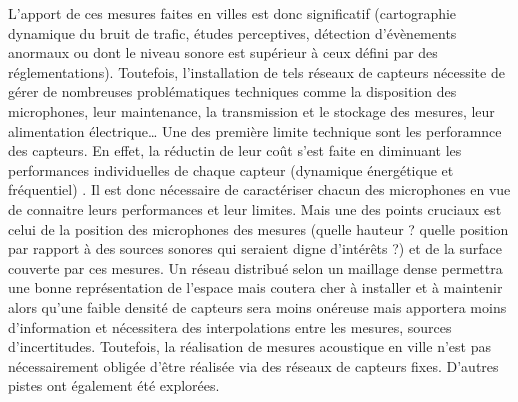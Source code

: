 L'apport de ces mesures faites en villes est donc significatif (cartographie dynamique du bruit de trafic, études perceptives, détection d'évènements anormaux ou dont le niveau sonore est supérieur à ceux défini par des réglementations). Toutefois, l'installation de tels réseaux de capteurs nécessite de gérer de nombreuses problématiques techniques comme la disposition des microphones, leur maintenance, la transmission et le stockage des mesures, leur alimentation électrique\dots{} Une des première limite technique sont les perforamnce des capteurs. En effet, la réductin de leur coût s'est faite en diminuant les performances  individuelles de chaque capteur (dynamique énergétique et fréquentiel) \cite{aumond2017study}. Il est donc nécessaire de caractériser chacun des microphones en vue de connaitre leurs performances et leur limites.
Mais une des points cruciaux est celui de la position des microphones des mesures (quelle hauteur ? quelle position par rapport à des sources sonores qui seraient digne d'intérêts ?) et de la surface couverte par ces mesures. Un réseau distribué selon un maillage dense permettra une bonne représentation de l'espace mais coutera cher à installer et à maintenir alors qu'une faible densité de capteurs sera moins onéreuse mais apportera moins d'information et nécessitera des interpolations entre les mesures, sources d'incertitudes.
Toutefois, la réalisation de mesures acoustique en ville n'est pas nécessairement obligée d'être réalisée via des réseaux de capteurs fixes. D'autres pistes ont également été explorées.

